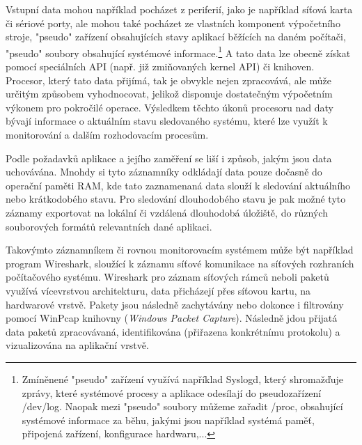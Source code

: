 Vstupní data mohou například pocházet z periferií, jako je například síťová karta či sériové porty, ale mohou také pocházet ze vlastních komponent výpočetního stroje, "pseudo" zařízení obsahujících stavy aplikací běžících na daném počítači, "pseudo" soubory obsahující systémové informace.\footnote{Zmíněnené "pseudo" zařízení využívá například Syslogd, který shromažďuje zprávy, které systémové procesy a aplikace odesílají do pseudozařízení /dev/log. Naopak mezi "pseudo" soubory můžeme zařadit /proc, obsahující systémové informace za běhu, jakými jsou například systémá paměť, připojená zařízení, konfigurace hardwaru,...} A tato data lze obecně získat pomocí speciálních API (např. již zmiňovaných kernel API) či knihoven. Procesor, který tato data přijímá, tak je obvykle nejen zpracovává, ale může určitým způsobem vyhodnocovat, jelikož disponuje dostatečným výpočetním výkonem pro pokročilé operace. Výsledkem těchto úkonů procesoru nad daty bývají informace o aktuálním stavu sledovaného systému, které lze využít k monitorování a dalším rozhodovacím procesům. \cite{linux_in_action_log_and_monitoring}

% 
Podle požadavků aplikace a jejího zaměření se liší i způsob, jakým jsou data uchovávána. Mnohdy si tyto záznamníky odkládají data pouze dočasně do operační paměti RAM, kde tato zaznamenaná data slouží k sledování aktuálního nebo krátkodobého stavu. Pro sledování dlouhodobého stavu je pak možné tyto záznamy exportovat na lokální či vzdálená dlouhodobá úložiště, do různých souborových formátů relevantních dané aplikaci.

Takovýmto záznamníkem či rovnou monitorovacím systémem může být například program Wireshark, sloužící k záznamu síťové komunikace na síťových rozhraních počítačového systému. Wireshark pro záznam síťových rámců neboli paketů využívá vícevrstvou architekturu, data přicházejí přes síťovou kartu, na hardwarové vrstvě. Pakety jsou následně zachytávány nebo dokonce i filtrovány pomocí WinPcap knihovny (\textit{Windows Packet Capture}). Následně jdou přijatá data paketů zpracovávaná, identifikována (přiřazena konkrétnímu protokolu) a vizualizována na aplikační vrstvě. \cite{researchgate_wireshark_architecture, wireshark_architecture_diagram}


